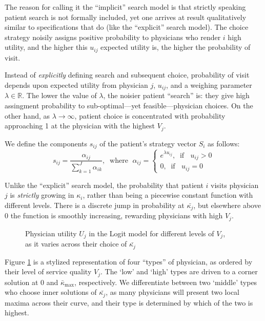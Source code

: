 \documentclass[../main.tex]{subfiles}
\begin{document}
The reason for calling it the ``implicit'' search model is that strictly speaking patient search is not formally included, yet one arrives at result qualitatively similar to specifications that do (like the ``explicit'' search model). The choice strategy noisily assigns positive probability to physicians who render $i$ high utility, and the higher this $u_{ij}$ expected utility is, the higher the probability of visit.

Instead of \textit{explicitly} defining search and subsequent choice, probability of visit depends upon expected utility from physician $j$, $u_{ij}$, and a weighing parameter $\lambda \in \mathbb{R}$. The lower the value of $\lambda$, the noisier patient ``search'' is: they give high assingment probability to sub-optimal—yet feasible—physician choices. On the other hand, as $\lambda \rightarrow \infty$, patient choice is concentrated with probability approaching 1 at the physician with the highest $V_j$.

We define the components $s_{ij}$ of the patient's strategy vector $S_i$ as follows:
\begin{equation}
s_{ij} = \frac{\alpha_{ij}}{\sum_{k = 1}^{J} \alpha_{ik}}, \; \; \text{where } \; \alpha_{ij} = \begin{cases}
e^{\lambda u_{ij}}, \; \; \text{if } \; \; u_{ij} > 0 \\
0 , \; \; \text{if } \; \; u_{ij} = 0
\end{cases}
\label{eq:Logit_s}
\end{equation}

Unlike the ``explicit'' search model, the probability that patient $i$ visits physician $j$ is \textit{strictly} growing in $\kappa_i$, rather than being a piecewise constant function with different levels. There is a discrete jump in probability at $\bar{\kappa_j}$, but elsewhere above $0$ the function is smoothly increasing, rewarding physicians with high $V_j$.

\begin{figure}[H]
\centering
\begin{tikzpicture}[scale=0.6]

\end{tikzpicture}
\caption{Physician utility $U_j$ in the Logit model for different levels of $V_j$,\\ as it varies across their choice of $\bar{\kappa_j}$}
\label{fig:LogitUj}
\end{figure}

Figure \ref{fig:LogitUj} is a stylized representation of four ``types'' of physician, as ordered by their level of service quality $V_j$. The `low' and `high' types are driven to a corner solution at 0 and $\bar{\kappa}_{\max}$, respectively. We differentiate between two `middle' types who choose inner solutions of $\bar{\kappa_j}$, as many physicians will present two local maxima across their curve, and their type is determined by which of the two is highest.
\end{document}
